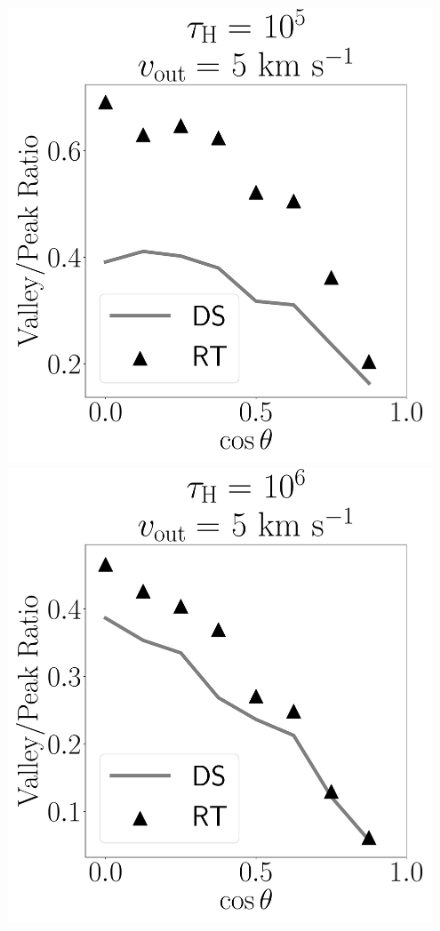 \documentclass[a4paper,fleqn,usenatbib]{mnras}
\begin{document}
\begin{figure}
	\begin{center}
		\includegraphics[height=0.12\textheight]{./figures/results/line_characterization_vi_vout5_vrot100_logtau5}
		\includegraphics[height=0.12\textheight]{./figures/results/line_characterization_vi_vout5_vrot100_logtau6}

\end{center}
\end{figure}
\end{document}
